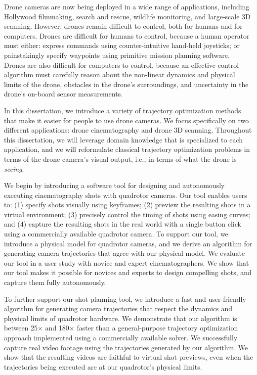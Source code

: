 
Drone cameras are now being deployed in a wide range of applications, including Hollywood filmmaking, search and rescue, wildlife monitoring, and large-scale 3D scanning.
However, drones remain difficult to control, both for humans and for computers.
Drones are difficult for humans to control, because a human operator must either: express commands using counter-intuitive hand-held joysticks; or painstakingly specify waypoints using primitive mission planning software.
Drones are also difficult for computers to control, because an effective control algorithm must carefully reason about the non-linear dynamics and physical limits of the drone, obstacles in the drone's surroundings, and uncertainty in the drone's on-board sensor measurements.

In this dissertation, we introduce a variety of trajectory optimization methods that make it easier for people to use drone cameras.
We focus specifically on two different applications: drone cinematography and drone 3D scanning.
Throughout this dissertation, we will leverage domain knowledge that is specialized to each application, and we will reformulate classical trajectory optimization problems in terms of the drone camera's visual output, i.e., in terms of what the drone is \emph{seeing}.

We begin by introducing a software tool for designing and autonomously executing cinematography shots with quadrotor cameras.
Our tool enables users to: (1) specify shots visually using keyframes; (2) preview the resulting shots in a virtual environment; (3) precisely control the timing of shots using easing curves; and (4) capture the resulting shots in the real world with a single button click using a commercially available quadrotor camera.
To support our tool, we introduce a physical model for quadrotor cameras, and we derive an algorithm for generating camera trajectories that agree with our physical model.
We evaluate our tool in a user study with novice and expert cinematographers.
We show that our tool makes it possible for novices and experts to design compelling shots, and capture them fully autonomously.

To further support our shot planning tool, we introduce a fast and user-friendly algorithm for generating camera trajectories that respect the dynamics and physical limits of quadrotor hardware.
We demonstrate that our algorithm is between 25$\times$ and 180$\times$ faster than a general-purpose trajectory optimization approach implemented using a commercially available solver.
We successfully capture real video footage using the trajectories generated by our algorithm.
We show that the resulting videos are faithful to virtual shot previews, even when the trajectories being executed are at our quadrotor's physical limits.

